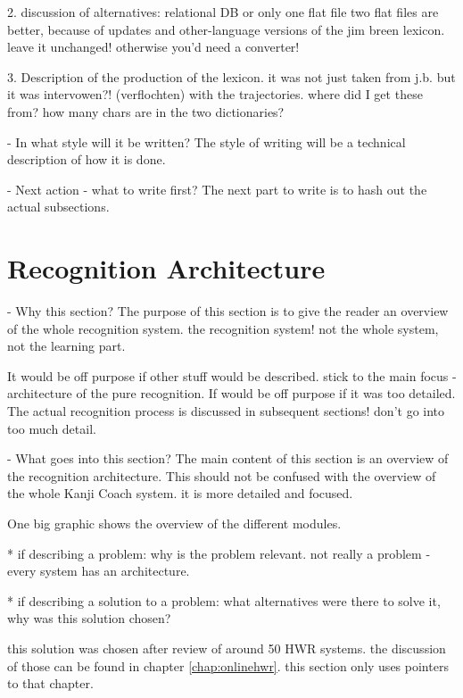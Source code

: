   2. discussion of alternatives: relational DB or only one flat file
     two flat files are better, because of updates and other-language versions
     of the jim breen lexicon. leave it unchanged! otherwise you'd need a
     converter!

  3. Description of the production of the lexicon.
     it was not just taken from j.b. but it was intervowen?! (verflochten) 
     with the trajectories. where did I get these from? 
     how many chars are in the two dictionaries?

- In what style will it be written?
  The style of writing will be a technical description of how it is done.

- Next action - what to write first?
  The next part to write is to hash out the actual subsections.

\section{Recognition Architecture}
\label{sec:hwre:recognitionarchitecture}

- Why this section? 
  The purpose of this section is to give the reader an overview of the whole
  recognition system. the recognition system! not the whole system, 
  not the learning part.

  It would be off purpose if other stuff would be described.
  stick to the main focus - architecture of the pure recognition.
  If would be off purpose if it was too detailed.
  The actual recognition process is discussed in subsequent sections!
  don't go into too much detail.

- What goes into this section?
  The main content of this section is an overview of the recognition 
  architecture. This should not be confused with the overview of the
  whole Kanji Coach system. it is more detailed and focused.

  One big graphic shows the overview of the different modules.
  
  * if describing a problem: why is the problem relevant.
    not really a problem - every system has an architecture.
   
  * if describing a solution to a problem: what alternatives were
    there to solve it, why was this solution chosen? 

    this solution was chosen after review of around 50 HWR systems.
    the discussion of those can be found in chapter \ref{chap:onlinehwr}.
    this section only uses pointers to that chapter.

